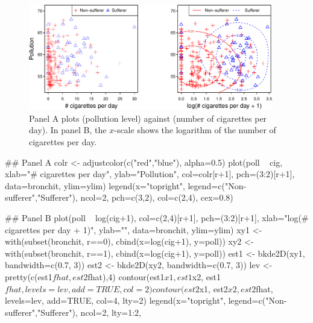 \begin{figure}
\begin{Schunk}


\centerline{\includegraphics[width=0.95\textwidth]{figs/8-bronchitAB-1} }

\end{Schunk}
\caption{Panel A plots  (pollution level) against
   (number of cigarettes per day).  In panel B, the
  $x$-scale shows the logarithm of the number of cigarettes per
  day.\label{fig:cig-poll}}
\vspace*{12pt}
\end{figure}

\begin{Schunk}
\begin{Sinput}
## Panel A
colr <- adjustcolor(c("red","blue"), alpha=0.5)
plot(poll ~ cig,
     xlab="# cigarettes per day", ylab="Pollution",
     col=colr[r+1], pch=(3:2)[r+1], data=bronchit,
     ylim=ylim)
legend(x="topright",
       legend=c("Non-sufferer","Sufferer"),
       ncol=2, pch=c(3,2), col=c(2,4), cex=0.8)
\end{Sinput}
\end{Schunk}


\begin{fullwidth}
\begin{Schunk}
\begin{Sinput}
## Panel B
plot(poll ~ log(cig+1), col=c(2,4)[r+1], pch=(3:2)[r+1],
     xlab="log(# cigarettes per day + 1)", ylab="", data=bronchit, ylim=ylim)
xy1 <- with(subset(bronchit, r==0), cbind(x=log(cig+1), y=poll))
xy2 <- with(subset(bronchit, r==1), cbind(x=log(cig+1), y=poll))
est1 <- bkde2D(xy1, bandwidth=c(0.7, 3))
est2 <- bkde2D(xy2, bandwidth=c(0.7, 3))
lev <- pretty(c(est1$fhat, est2$fhat),4)
contour(est1$x1, est1$x2, est1$fhat, levels=lev, add=TRUE, col=2)
contour(est2$x1, est2$x2, est2$fhat, levels=lev, add=TRUE, col=4, lty=2)
legend(x="topright", legend=c("Non-sufferer","Sufferer"), ncol=2, lty=1:2,
\end{Sinput}
\end{Schunk}
\end{fullwidth}

